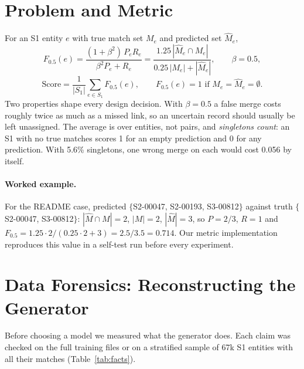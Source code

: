 \documentclass[10pt]{article}
\newcommand{\Fh}{F_{0.5}}
\begin{document}
\section{Problem and Metric}
For an S1 entity $e$ with true match set $M_e$ and predicted set $\hat M_e$,
\begin{equation}
\Fh(e) = \frac{(1+\beta^2)\,P_e R_e}{\beta^2 P_e + R_e} = \frac{1.25\,|\hat M_e \cap M_e|}{0.25\,|M_e| + |\hat M_e|}, \qquad \beta = 0.5,
\label{eq:f05}
\end{equation}
\begin{equation}
\text{Score} = \frac{1}{|S_1|}\sum_{e\in S_1} \Fh(e), \qquad \Fh(e) = 1 \text{ if } M_e = \hat M_e = \emptyset.
\label{eq:macro}
\end{equation}
Two properties shape every design decision. With $\beta = 0.5$ a false merge costs roughly twice as much as a missed link, so an uncertain record should usually be left unassigned. The average is over entities, not pairs, and \emph{singletons count}: an S1 with no true matches scores 1 for an empty prediction and 0 for any prediction. With 5.6\% singletons, one wrong merge on each would cost 0.056 by itself.

\paragraph{Worked example.} For the README case, predicted $\{$S2-00047, S2-00193, S3-00812$\}$ against truth $\{$S2-00047, S3-00812$\}$: $|\hat M \cap M| = 2$, $|M| = 2$, $|\hat M| = 3$, so $P = 2/3$, $R = 1$ and $\Fh = 1.25\cdot 2/(0.25\cdot 2 + 3) = 2.5/3.5 = 0.714$. Our metric implementation reproduces this value in a self-test run before every experiment.

\section{Data Forensics: Reconstructing the Generator}
\label{sec:forensics}
Before choosing a model we measured what the generator does. Each claim was checked on the full training files or on a stratified sample of 67k S1 entities with all their matches (Table~\ref{tab:facts}).
\end{document}
